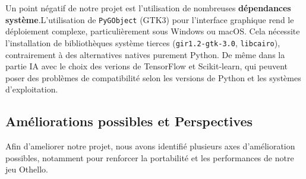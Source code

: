 \documentclass[a4paper]{article}
\begin{document}
Un point négatif de notre projet est l'utilisation de nombreuses \textbf{dépendances système}.L'utilisation de \texttt{PyGObject} (GTK3) pour l'interface graphique rend le déploiement complexe, 
particulièrement sous Windows ou macOS. 
Cela nécessite l'installation de bibliothèques système tierces (\texttt{gir1.2-gtk-3.0}, \texttt{libcairo}), 
contrairement à des alternatives natives purement Python. 
De même dans la partie IA avec le choix des verions de TensorFlow et Scikit-learn, 
qui peuvent poser des problèmes de compatibilité selon les versions de Python et les systèmes d'exploitation.

\subsection{Améliorations possibles et Perspectives}

Afin d'ameliorer notre projet, nous avons identifié plusieurs axes d'amélioration possibles, 
notamment pour renforcer la portabilité et les performances de notre jeu Othello.
\end{document}
